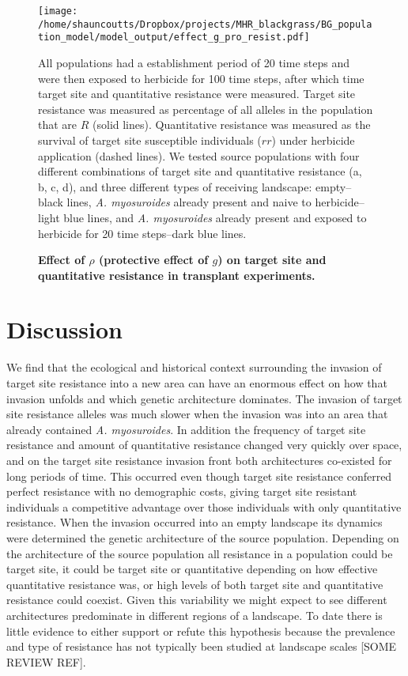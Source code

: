 \documentclass[10pt,letterpaper]{article}
\begin{document}
\begin{figure}[!h] 
	\texttt{[image: /home/shauncoutts/Dropbox/projects/MHR\_blackgrass/BG\_population\_model/model\_output/effect\_g\_pro\_resist.pdf]}
\caption{\bf Effect of $\rho$ (protective effect of $g$) on target site and quantitative resistance in transplant experiments.} All populations had a establishment period of 20 time steps and were then exposed to herbicide for 100 time steps, after which time target site and quantitative resistance were measured. Target site resistance was measured as percentage of all alleles in the population that are $R$ (solid lines). Quantitative resistance was measured as the survival of target site susceptible individuals ($rr$) under herbicide application (dashed lines). We tested source populations with four different combinations of target site and quantitative resistance (a, b, c, d), and three different types of receiving landscape: empty--black lines, \textit{A. myosuroides} already present and naive to herbicide--light blue lines, and \textit{A. myosuroides} already present and exposed to herbicide for 20 time steps--dark blue lines.        
\label{fig:transloc_gpro}
\end{figure}

\section*{Discussion}
We find that the ecological and historical context surrounding the invasion of target site resistance into a new area can have an enormous effect on how that invasion unfolds and which genetic architecture dominates. The invasion of target site resistance alleles was much slower when the invasion was into an area that already contained \textit{A. myosuroides}. In addition the frequency of target site resistance and amount of quantitative resistance changed very quickly over space, and on the target site resistance invasion front both architectures co-existed for long periods of time. This occurred even though target site resistance conferred perfect resistance with no demographic costs, giving target site resistant individuals a competitive advantage over those individuals with only quantitative resistance. When the invasion occurred into an empty landscape its dynamics were determined the genetic architecture of the source population. Depending on the architecture of the source population all resistance in a population could be target site, it could be target site or quantitative depending on how effective quantitative resistance was, or high levels of both target site and quantitative resistance could coexist. Given this variability we might expect to see different architectures predominate in different regions of a landscape. To date there is little evidence to either support or refute this hypothesis because the prevalence and type of resistance has not typically been studied at landscape scales [SOME REVIEW REF].
\end{document}
